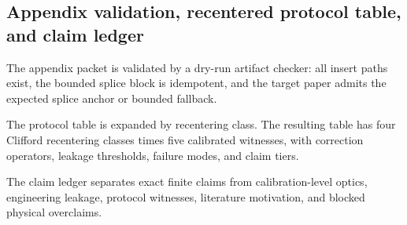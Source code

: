 \subsection{Appendix validation, recentered protocol table, and claim ledger}
\label{sec:bt1583-bt1585-validation-ledger}

The appendix packet is validated by a dry-run artifact checker: all insert paths exist, the bounded splice block is idempotent, and the target paper admits the expected splice anchor or bounded fallback.

The protocol table is expanded by recentering class.  The resulting table has four Clifford recentering classes times five calibrated witnesses, with correction operators, leakage thresholds, failure modes, and claim tiers.

The claim ledger separates exact finite claims from calibration-level optics, engineering leakage, protocol witnesses, literature motivation, and blocked physical overclaims.
